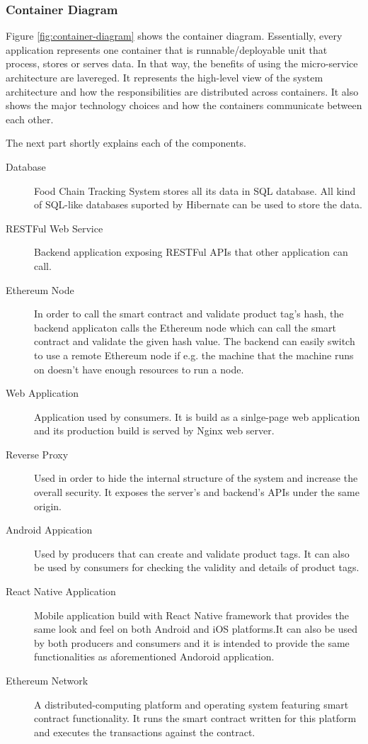  \subsubsection{Container Diagram}

Figure \ref{fig:container-diagram} shows the container diagram. Essentially, every application represents one container that is runnable/deployable unit that process, stores or serves data. In that way, the benefits of using the micro-service architecture are lavereged. It represents the high-level view of the system architecture and how the responsibilities are distributed across containers. It also shows the major technology choices and how the containers communicate between each other.

The next part shortly explains each of the components.

\begin{description}
    \item[Database] 
    Food Chain Tracking System stores all its data in SQL database. All kind of SQL-like databases suported by Hibernate can be used to store the data.
    
    \item[RESTFul Web Service]
    Backend application exposing RESTFul APIs that other application can call.
    
    \item[Ethereum Node]
    In order to call the smart contract and validate product tag's hash, the backend applicaton calls the Ethereum node which can call the smart contract and validate the given hash value. The backend can easily switch to use a remote Ethereum node if e.g. the machine that the machine runs on doesn't have enough resources to run a node. 
    
    \item[Web Application]
    Application used by consumers. It is build as a sinlge-page web application and its production build is served by Nginx web server.
    
    \item[Reverse Proxy]
    Used in order to hide the internal structure of the system and increase the overall security. It exposes the server's and backend's APIs under the same origin. 
    
    \item[Android Appication]
    Used by producers that can create and validate product tags. It can also be used by consumers for checking the validity and details of product tags.
    
    \item[React Native Application]
    Mobile application build with React Native framework that provides the same look and feel on both Android and iOS platforms.It can also be used by both producers and consumers and it is intended to provide the same functionalities as aforementioned Andoroid application.
    
    \item[Ethereum Network]
    A distributed-computing platform and operating system featuring smart contract functionality. It runs the smart contract written for this platform and executes the transactions against the contract. 
\end{description}


